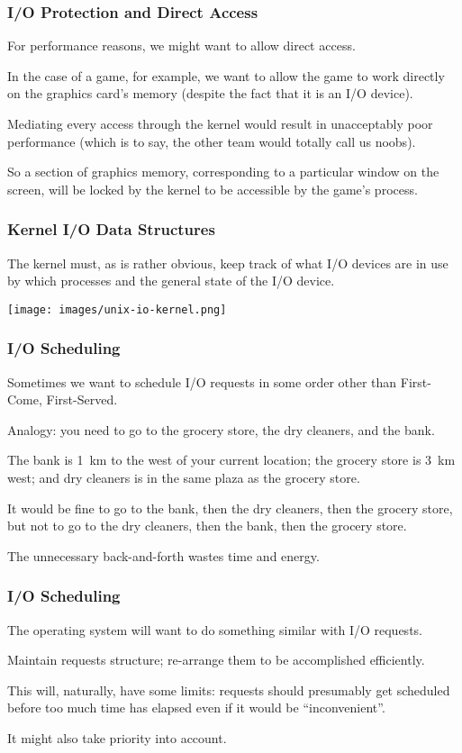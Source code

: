 \begin{frame}
\frametitle{I/O Protection and Direct Access}

For performance reasons, we might want to allow direct access. 

In the case of a game, for example, we want to allow the game to work directly on the graphics card's memory (despite the fact that it is an I/O device). 

Mediating every access through the kernel would result in unacceptably poor performance (which is to say, the other team would totally call us noobs). 

So a section of graphics memory, corresponding to a particular window on the screen, will be locked by the kernel to be accessible by the game's process.


\end{frame}

\begin{frame}
\frametitle{Kernel I/O Data Structures}
The kernel must, as is rather obvious, keep track of what I/O devices are in use by which processes and the general state of the I/O device.

\begin{center}
	\texttt{[image: images/unix-io-kernel.png]}
\end{center}


\end{frame}

\begin{frame}
\frametitle{I/O Scheduling}

Sometimes we want to schedule I/O requests in some order other than First-Come, First-Served. 

Analogy: you need to go to the grocery store, the dry cleaners, and the bank. 

The bank is 1~km to the west of your current location; the grocery store is 3~km west; and dry cleaners is in the same plaza as the grocery store. 

It would be fine to go to the bank, then the dry cleaners, then the grocery store, but not to go to the dry cleaners, then the bank, then the grocery store. 

The unnecessary back-and-forth wastes time and energy.


\end{frame}

\begin{frame}
\frametitle{I/O Scheduling}
The operating system will want to do something similar with I/O requests.

Maintain requests structure; re-arrange them to be accomplished efficiently.

This will, naturally, have some limits: requests should presumably get scheduled before too much time has elapsed even if it would be ``inconvenient''. 

It might also take priority into account. 

\end{frame}



